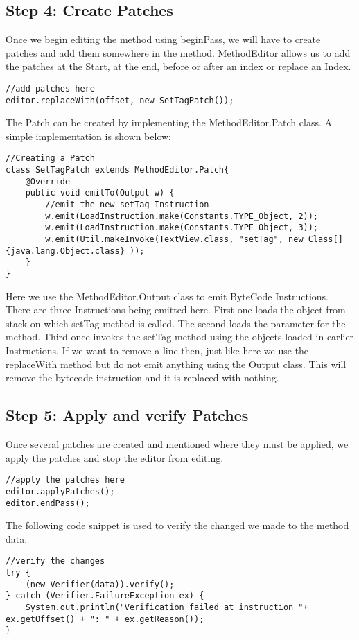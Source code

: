 \documentclass[11pt,psfig,a4]{article}
\begin{document}
\begin{flushleft}
\subsection{Step 4: Create Patches}
Once we begin editing the method using beginPass, we will have to create patches and add them somewhere in the method. MethodEditor allows us to add the patches at the Start, at the end, before or after an index or replace an Index.\\
\begin{lstlisting}
//add patches here
editor.replaceWith(offset, new SetTagPatch());
\end{lstlisting}
The Patch can be created by implementing the MethodEditor.Patch class. A simple implementation is shown below:\\
\begin{lstlisting}
//Creating a Patch
class SetTagPatch extends MethodEditor.Patch{
	@Override
	public void emitTo(Output w) {
		//emit the new setTag Instruction
		w.emit(LoadInstruction.make(Constants.TYPE_Object, 2));
		w.emit(LoadInstruction.make(Constants.TYPE_Object, 3));
		w.emit(Util.makeInvoke(TextView.class, "setTag", new Class[] {java.lang.Object.class} ));
	}
}
\end{lstlisting}
Here we use the MethodEditor.Output class to emit ByteCode Instructions. There are three Instructions being emitted here. First one loads the object from stack on which setTag method is called. The second loads the parameter for the method. Third once invokes the setTag method using the objects loaded in earlier Instructions. If we want to remove a line then, just like here we use the replaceWith method but do not emit anything using the Output class. This will remove the bytecode instruction and it is replaced with nothing.\\
\subsection{Step 5: Apply and verify Patches}
Once several patches are created and mentioned where they must be applied, we apply the patches and stop the editor from editing.\\
\begin{lstlisting}
//apply the patches here
editor.applyPatches(); 
editor.endPass();
\end{lstlisting}
The following code snippet is used to verify the changed we made to the method data.\\
\begin{lstlisting}
//verify the changes
try {
	(new Verifier(data)).verify();
} catch (Verifier.FailureException ex) {
	System.out.println("Verification failed at instruction "+ ex.getOffset() + ": " + ex.getReason());
}
\end{lstlisting}

\end{flushleft}
\end{document}
